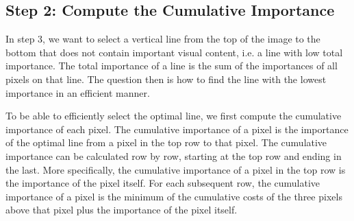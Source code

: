 \documentclass{article}
\begin{document}
\subsection*{Step 2: Compute the Cumulative Importance}
In step 3, we want to select a vertical line from the top of the image to the bottom that does not contain important visual content, i.e. a line with low total importance. The total importance of a line is the sum of the importances of all pixels on that line. The question then is how to find the line with the lowest importance in an efficient manner.

To be able to efficiently select the optimal line, we first compute the cumulative importance of each pixel. The cumulative importance of a pixel is the importance of the optimal line from a pixel in the top row to that pixel. The cumulative importance can be calculated row by row, starting at the top row and ending in the last. More specifically, the cumulative importance of a pixel in the top row is the importance of the pixel itself. For each subsequent row, the cumulative importance of a pixel is the minimum of the cumulative costs of the three pixels above that pixel plus the importance of the pixel itself.
\end{document}

